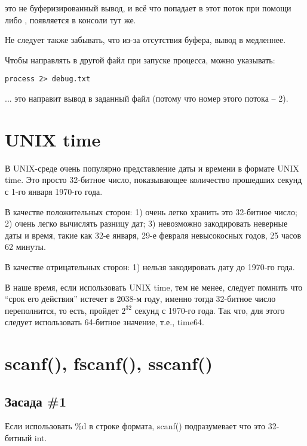  это не буферизированный вывод, и всё что попадает в этот поток при помощи 
 либо , появляется в консоли тут же.

Не следует также забывать, что из-за отсутствия буфера, вывод в  медленнее.

Чтобы направлять  в другой файл при запуске процесса, можно указывать:

\begin{lstlisting}
process 2> debug.txt
\end{lstlisting}

... это направит вывод  в заданный файл (потому что номер этого потока -- 2).

\section{UNIX time}

В UNIX-среде очень популярно представление даты и времени в формате UNIX time.
Это просто 32-битное число, показывающее
количество прошедших секунд с 1-го января 1970-го года.

В качестве положительных сторон: 1) очень легко хранить это 32-битное число; 2) очень легко вычислять разницу дат;
3) невозможно закодировать неверные даты и время, такие как 32-е января, 29-е февраля невысокосных годов, 
25 часов 62 минуты.

В качестве отрицательных сторон: 1) нельзя закодировать дату до 1970-го года.

В наше время, если использовать UNIX time, тем не менее, следует помнить что ``срок его действия'' истечет
в 2038-м году, именно тогда 32-битное число переполнится, то есть, пройдет $2^{32}$ секунд с 1970-го года.
Так что, для этого следует использовать 64-битное значение, т.е., time64.


\section{scanf(), fscanf(), sscanf()}

\subsection{Засада \#1}

Если использовать \%d в строке формата, scanf() подразумевает что это 32-битный int. 


